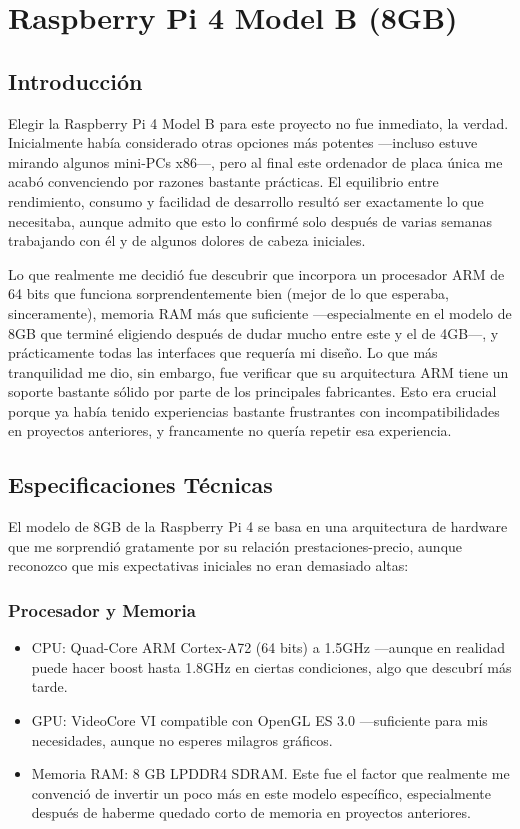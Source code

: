 \chapter{Raspberry Pi 4 Model B (8GB)}

\section{Introducción}
    Elegir la Raspberry Pi 4 Model B \cite{raspberrypi4} para este proyecto no fue inmediato, la verdad. Inicialmente había considerado otras opciones más potentes —incluso estuve mirando algunos mini-PCs x86—, pero al final este ordenador de placa única me acabó convenciendo por razones bastante prácticas. El equilibrio entre rendimiento, consumo y facilidad de desarrollo resultó ser exactamente lo que necesitaba, aunque admito que esto lo confirmé solo después de varias semanas trabajando con él y de algunos dolores de cabeza iniciales.

    Lo que realmente me decidió fue descubrir que incorpora un procesador ARM de 64 bits que funciona sorprendentemente bien (mejor de lo que esperaba, sinceramente), memoria RAM más que suficiente —especialmente en el modelo de 8GB que terminé eligiendo después de dudar mucho entre este y el de 4GB—, y prácticamente todas las interfaces que requería mi diseño. Lo que más tranquilidad me dio, sin embargo, fue verificar que su arquitectura ARM tiene un soporte bastante sólido por parte de los principales fabricantes. Esto era crucial porque ya había tenido experiencias bastante frustrantes con incompatibilidades en proyectos anteriores, y francamente no quería repetir esa experiencia.

\section{Especificaciones Técnicas}
    El modelo de 8GB de la Raspberry Pi 4 se basa en una arquitectura de hardware que me sorprendió gratamente por su relación prestaciones-precio, aunque reconozco que mis expectativas iniciales no eran demasiado altas:

    \subsection{Procesador y Memoria}
    \begin{itemize}
        \item CPU: Quad-Core ARM Cortex-A72 (64 bits) a 1.5GHz —aunque en realidad puede hacer boost hasta 1.8GHz en ciertas condiciones, algo que descubrí más tarde.
        \item GPU: VideoCore VI compatible con OpenGL ES 3.0 —suficiente para mis necesidades, aunque no esperes milagros gráficos.
        \item Memoria RAM: 8 GB LPDDR4 SDRAM. Este fue el factor que realmente me convenció de invertir un poco más en este modelo específico, especialmente después de haberme quedado corto de memoria en proyectos anteriores.
    \end{itemize}

